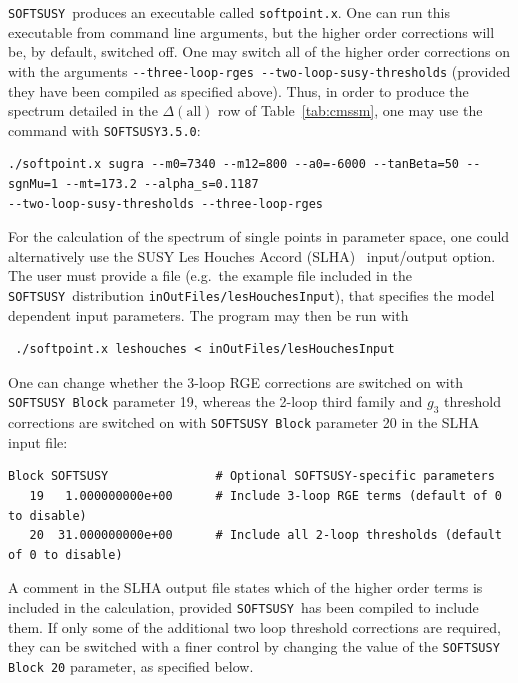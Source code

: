 \documentclass[final,3p,times,pdflatex]{elsarticle}
\def\SOFTSUSY{{\tt SOFTSUSY}}
\def\code#1{{\tt #1}}
\begin{document}
\SOFTSUSY~produces an executable called \code{softpoint.x}. 
One can run this executable from command line arguments, but the higher order
corrections will be, by default, switched off. One may switch all of the
higher order corrections on with 
the arguments 
\verb|--three-loop-rges --two-loop-susy-thresholds|
(provided they have
been compiled as specified above).
Thus, in order to produce the spectrum detailed in the $\Delta(\mbox{all})$
row of Table~\ref{tab:cmssm}, one may use the command with {\tt SOFTSUSY3.5.0}:
{\small\begin{verbatim}
./softpoint.x sugra --m0=7340 --m12=800 --a0=-6000 --tanBeta=50 --sgnMu=1 --mt=173.2 --alpha_s=0.1187 
--two-loop-susy-thresholds --three-loop-rges
\end{verbatim}\normalsize}
For the calculation
of the spectrum of single points in parameter space, one could alternatively use the
SUSY Les Houches Accord (SLHA)~\cite{Skands:2003cj} input/output
option. The user must provide a file (e.g.\ the example file included
in the \SOFTSUSY~distribution
\code{inOutFiles/lesHouchesInput}), that specifies the model dependent input
parameters. The program may then be run with
\small
\begin{verbatim}
 ./softpoint.x leshouches < inOutFiles/lesHouchesInput
\end{verbatim}
\normalsize

One can change whether the 3-loop RGE corrections are switched on with
\code{SOFTSUSY Block} parameter 19, whereas the 2-loop third family and $g_3$
threshold corrections 
are switched on with \code{SOFTSUSY Block} parameter 20 in the SLHA input file:
\begin{verbatim}
Block SOFTSUSY               # Optional SOFTSUSY-specific parameters
   19   1.000000000e+00      # Include 3-loop RGE terms (default of 0 to disable)
   20  31.000000000e+00      # Include all 2-loop thresholds (default of 0 to disable)
\end{verbatim}
A comment in the SLHA output file states which of the higher order terms is
included in the calculation, provided {\tt SOFTSUSY}~has been compiled to
include them. If only some of the additional two loop threshold corrections
are required, they can be switched with a finer control by changing the value
of the {\tt SOFTSUSY Block 20} parameter, as specified below.
\end{document}
